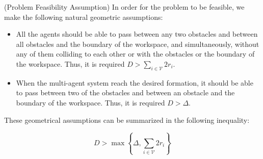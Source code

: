 \begin{gray_box}
\begin{assumption}(Problem Feasibility Assumption)
	In order for the problem to be feasible, we make the following natural
  geometric assumptions:

	\begin{itemize}
		\item All the agents should be able to pass between any two obstacles
      and between all obstacles and the boundary of the workspace, and
      simultaneously, without any of them colliding to each other or with the
      obstacles or the boundary of the workspace.
      Thus, it is required $D >  \sum_{i \in \mathcal{V}}^{} 2r_i$.
		\item When the multi-agent system reach the desired formation, it should be
      able to pass between two of the obstacles and between an obstacle and the
      boundary of the workspace. Thus, it is required $D > \Delta$.
	\end{itemize}

	These geometrical assumptions can be summarized in the following
  inequality:

	\begin{equation} \label{eq:geometric_constraint}
    D > \max\left\{\Delta, \sum_{i \in \mathcal{V}}^{} 2r_i \right\}
	\end{equation}

\end{assumption}
\end{gray_box}
